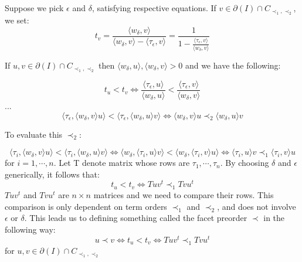 \documentclass[12pt,a4paper]{report}
\begin{document}
Suppose we pick $\epsilon$ and $\delta$, satisfying respective equations. If $v \in \partial (I) \cap C_{{\prec_{1}}, \prec_{2}}$, we set:
\begin{equation*}
    t_{v} = \frac{\langle w_{\delta}, v \rangle}{\langle w_{\delta}, v \rangle - \langle \tau_{\epsilon}, v \rangle} = \frac{1}{1 - \frac{\langle \tau_{\epsilon}, v \rangle} {\langle w_{\delta}, v \rangle }}
\end{equation*}

If $u, v \in \partial (I) \cap C_{{\prec_{1}}, \prec_{2}}$ then $\langle w_{\delta}, u \rangle, \langle w_{\delta}, v \rangle > 0$ and we have the following:

\begin{equation*}
    t_{u} < t_{v} \Longleftrightarrow \frac{\langle \tau_{\epsilon}, u \rangle}{\langle w_{\delta}, u \rangle} < \frac{\langle \tau_{\epsilon}, v \rangle}{\langle w_{\delta}, v \rangle}
\end{equation*}
...
\begin{equation*}
    \langle \tau_{\epsilon}, \langle w_{\delta}, v \rangle u \rangle < \langle \tau_{\epsilon}, \langle w_{\delta}, u \rangle v \rangle \Longleftrightarrow \langle w_{\delta}, v \rangle u \prec_{2} \langle w_{\delta}, u \rangle v
\end{equation*}

To evaluate this $\prec_{2}$:

\begin{equation*}
    \langle \tau_{i}, \langle w_{\delta}, v \rangle u \rangle < \langle \tau_{i}, \langle w_{\delta}, u \rangle v \rangle \Longleftrightarrow \langle w_{\delta}, \langle \tau_{i}, u \rangle v \rangle < \langle w_{\delta}, \langle \tau_{i}, v \rangle u \rangle \Longleftrightarrow \langle \tau_{i}, u \rangle v \prec_{1} \langle \tau_{i}, v \rangle u
\end{equation*}
for $i = 1, \cdots, n$. Let T denote matrix whose rows are $\tau_{1}, \cdots, \tau_{n}$. By choosing $\delta$ and $\epsilon$ generically, it follows that:
\begin{equation*}
    t_{u} < t_{v} \Longleftrightarrow Tuv^{t} \prec_{1} Tvu^{t}
\end{equation*}
$Tuv^{t}$ and $Tvu^{t}$ are $n \times n$ matrices and we need to compare their rows. This comparison is only dependent on term orders $\prec_{1}$ and $\prec_{2}$, and does not involve $\epsilon$ or $\delta$. This leads us to defining something called the facet preorder $\prec$ in the following way:
\begin{equation*}
    u \prec v \Longleftrightarrow t_{u} < t_{v} \Longleftrightarrow Tuv^{t} \prec_{1} Tvu^{t}
\end{equation*}
for $u, v \in \partial (I) \cap C_{{\prec_{1}, \prec_{2}}}$
\end{document}
